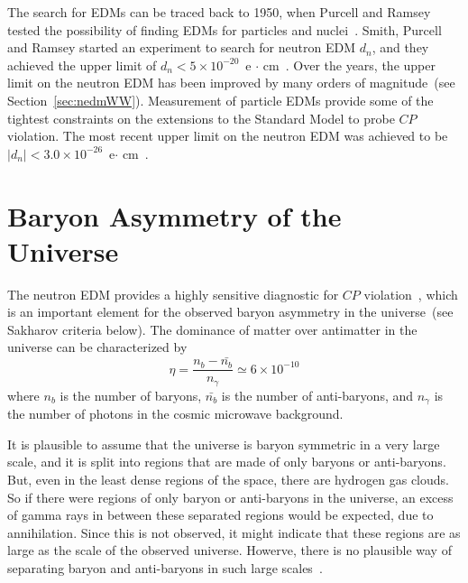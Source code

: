 
The search for EDMs can be traced back to 1950, when Purcell and
Ramsey tested the possibility of finding EDMs for particles and
nuclei~\cite{PhysRev.78.807}. Smith, Purcell and Ramsey started an
experiment to search for neutron EDM $d_n$, and they achieved the
upper limit of $d_n < 5 \times 10^{-20}$~e $\cdot$
cm~\cite{smith1957experimental}.  Over the years, the upper limit on
the neutron EDM has been improved by many orders of magnitude~(see
Section~\ref{sec:nedmWW}). Measurement of particle EDMs provide some
of the tightest constraints on the extensions to the Standard Model to
probe $CP$ violation. The most recent upper limit on the neutron EDM
was achieved to be $\vert d_n\vert < 3.0 \times 10^{-26} $~e$\cdot$
cm~\cite{Baker2006, pendlebury2015revised}.



\section{Baryon Asymmetry of the Universe\label{sec:BAU}}
The neutron EDM provides a highly sensitive diagnostic for $CP$
violation~\cite{pospelov2005electric, Abel2001}, which is an important
element for the observed baryon asymmetry in the universe~(see
Sakharov criteria below). The dominance of matter over antimatter in
the universe can be characterized by~\cite{Cline}
\begin{equation}
\eta = \frac{n_b-\bar{n_b}}{n_{\gamma}} \simeq 6 \times 10^{-10}
\end{equation}
where $n_b$ is the number of baryons, $\bar{n_b}$ is the number of
anti-baryons, and $n_{\gamma}$ is the number of photons in the cosmic
microwave background.

It is plausible to assume that the universe is baryon symmetric in a
very large scale, and it is split into regions that are made of only
baryons or anti-baryons.  But, even in the least dense regions of the
space, there are hydrogen gas clouds. So if there were regions of only
baryon or anti-baryons in the universe, an excess of gamma rays in
between these separated regions would be expected, due to
annihilation. Since this is not observed, it might indicate that these
regions are as large as the scale of the observed universe. Howerve,
there is no plausible way of separating baryon and anti-baryons in
such large scales~\cite{Cline}.

